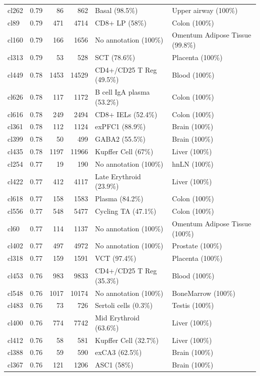 \begin{table}[ht!]
\begin{tabular}{lrrrll}
  cl262 & 0.79 &  86 & 862 & Basal (98.5\%) & Upper airway (100\%) \\ 
  cl89 & 0.79 & 471 & 4714 & CD8+ LP (58\%) & Colon (100\%) \\ 
  cl160 & 0.79 & 166 & 1656 & No annotation (100\%) & Omentum Adipose Tissue (99.8\%) \\ 
  cl313 & 0.79 &  53 & 528 & SCT (78.6\%) & Placenta (100\%) \\ 
  cl449 & 0.78 & 1453 & 14529 & CD4+/CD25 T Reg (49.5\%) & Blood (100\%) \\ 
  cl626 & 0.78 & 117 & 1172 & B cell IgA plasma (53.2\%) & Colon (100\%) \\ 
  cl616 & 0.78 & 249 & 2494 & CD8+ IELs (52.4\%) & Colon (100\%) \\ 
  cl361 & 0.78 & 112 & 1124 & exPFC1 (88.9\%) & Brain (100\%) \\ 
  cl399 & 0.78 &  50 & 499 & GABA2 (55.5\%) & Brain (100\%) \\ 
  cl435 & 0.78 & 1197 & 11966 & Kupffer Cell (67\%) & Liver (100\%) \\ 
  cl254 & 0.77 &  19 & 190 & No annotation (100\%) & hnLN (100\%) \\ 
  cl422 & 0.77 & 412 & 4117 & Late Erythroid (23.9\%) & Liver (100\%) \\ 
  cl618 & 0.77 & 158 & 1583 & Plasma (84.2\%) & Colon (100\%) \\ 
  cl556 & 0.77 & 548 & 5477 & Cycling TA (47.1\%) & Colon (100\%) \\ 
  cl60 & 0.77 & 114 & 1137 & No annotation (100\%) & Omentum Adipose Tissue (100\%) \\ 
  cl402 & 0.77 & 497 & 4972 & No annotation (100\%) & Prostate (100\%) \\ 
  cl318 & 0.77 & 159 & 1591 & VCT (97.4\%) & Placenta (100\%) \\ 
  cl453 & 0.76 & 983 & 9833 & CD4+/CD25 T Reg (35.3\%) & Blood (100\%) \\ 
  cl548 & 0.76 & 1017 & 10174 & No annotation (100\%) & BoneMarrow (100\%) \\ 
  cl483 & 0.76 &  73 & 726 & Sertoli cells (0.3\%) & Testis (100\%) \\ 
  cl400 & 0.76 & 774 & 7742 & Mid Erythroid (63.6\%) & Liver (100\%) \\ 
  cl412 & 0.76 &  58 & 581 & Kupffer Cell (32.7\%) & Liver (100\%) \\ 
  cl388 & 0.76 &  59 & 590 & exCA3 (62.5\%) & Brain (100\%) \\ 
  cl367 & 0.76 & 121 & 1206 & ASC1 (58\%) & Brain (100\%) \\ 

\end{tabular}
\end{table}
